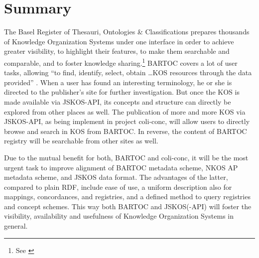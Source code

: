 \documentclass[12pt,a4paper]{llncs}
\begin{document}

\section{Summary}

The Basel Register of Thesauri, Ontologies \& Classifications prepares thousands of Knowledge Organization Systems under one interface in order to achieve greater visibility, to highlight their features, to make them searchable and comparable, and to foster knowledge sharing.\footnote{See \cite[20]{hlava2011developing}}
BARTOC covers a lot of user tasks, allowing ``to find, identify, select, obtain \ldots KOS resources through the data provided'' \cite[1906]{golub2014terminology}. When a user has found an interesting terminology, he or she is directed to the publisher's site for further investigation. But once the KOS is made available via JSKOS-API, its concepts and structure can directly be explored from other places as well. 
The publication of more and more KOS via JSKOS-API, as being implement in project coli-conc, will allow users to directly browse and search in KOS from BARTOC. In reverse, the content of BARTOC registry will be searchable from other sites as well. 

Due to the mutual benefit for both, BARTOC and coli-conc, it will be the most urgent task to improve alignment of BARTOC metadata scheme, NKOS AP metadata scheme, and JSKOS data format.
The advantages of the latter, compared to plain RDF, include ease of use, a uniform description also for mappings, concordances, and registries, and a defined method to query registries and concept schemes. This way both BARTOC and JSKOS(-API) will foster the visibility, availability and usefulness of Knowledge Organization Systems in general.



\end{document}
